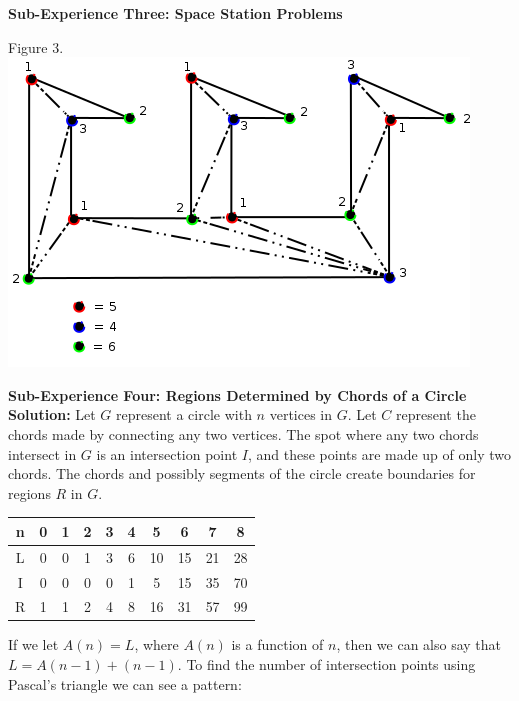 \documentclass[10pt,a4paper]{report}
\begin{document}
		
	\textbf{Sub-Experience Three: Space Station Problems}\\
	
		\begin{center}
			Figure 3.\\
			\includegraphics[scale=.5]{e3.png}
			\newline
			\newline
		\end{center}
	\textbf{Sub-Experience Four: Regions Determined by Chords of a Circle}\\
	
	\noindent\textbf{Solution: }Let $G$ represent a circle with $n$ vertices in $G$.  Let $C$ represent the chords made by connecting any two vertices.  The spot where any two chords intersect in $G$ is an intersection point $I$, and these points are made up of only two chords.  The chords and possibly segments of the circle create boundaries for regions $R$ in $G$.\\
	
	\begin{center}\begin{tabular}{c|c c c c c c c c c}
	n & 0 & 1 & 2 & 3 & 4 & 5 & 6 & 7 & 8\\
\hline
\hline
	L & 0 & 0 & 1 & 3 & 6 & 10 & 15 & 21 & 28\\
	I & 0 & 0 & 0 & 0 & 1 & 5 & 15 & 35 & 70\\
	R & 1 & 1 & 2 & 4 & 8 & 16 & 31 & 57 & 99\\
\end{tabular}\end{center}

	\noindent If we let $A(n)=L$, where $A(n)$ is a function of $n$, then we can also say that $L=A(n-1)+(n-1)$.  To find the number of intersection points using Pascal's triangle we can see a pattern:\\
	
\end{document}
